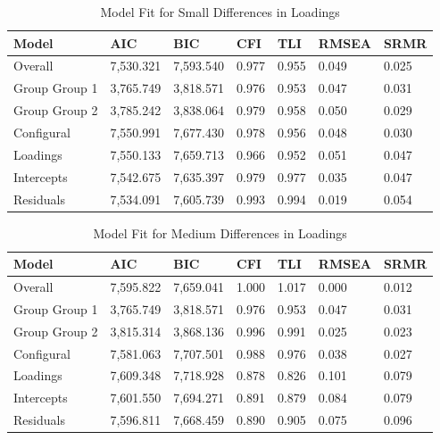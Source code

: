 \documentclass[
  man,floatsintext]{apa7}
\begin{document}
\begin{table}[tbp]

\begin{center}
\begin{threeparttable}

\caption{\label{tab:tab2}Model Fit for Small Differences in Loadings}

\begin{tabular}{lllllll}
\toprule
Model & AIC & BIC & CFI & TLI & RMSEA & SRMR\\
\midrule
Overall & 7,530.321 & 7,593.540 & 0.977 & 0.955 & 0.049 & 0.025\\
Group Group 1 & 3,765.749 & 3,818.571 & 0.976 & 0.953 & 0.047 & 0.031\\
Group Group 2 & 3,785.242 & 3,838.064 & 0.979 & 0.958 & 0.050 & 0.029\\
Configural & 7,550.991 & 7,677.430 & 0.978 & 0.956 & 0.048 & 0.030\\
Loadings & 7,550.133 & 7,659.713 & 0.966 & 0.952 & 0.051 & 0.047\\
Intercepts & 7,542.675 & 7,635.397 & 0.979 & 0.977 & 0.035 & 0.047\\
Residuals & 7,534.091 & 7,605.739 & 0.993 & 0.994 & 0.019 & 0.054\\
\bottomrule
\end{tabular}

\end{threeparttable}
\end{center}

\end{table}

\begin{table}[tbp]

\begin{center}
\begin{threeparttable}

\caption{\label{tab:tab3}Model Fit for Medium Differences in Loadings}

\begin{tabular}{lllllll}
\toprule
Model & AIC & BIC & CFI & TLI & RMSEA & SRMR\\
\midrule
Overall & 7,595.822 & 7,659.041 & 1.000 & 1.017 & 0.000 & 0.012\\
Group Group 1 & 3,765.749 & 3,818.571 & 0.976 & 0.953 & 0.047 & 0.031\\
Group Group 2 & 3,815.314 & 3,868.136 & 0.996 & 0.991 & 0.025 & 0.023\\
Configural & 7,581.063 & 7,707.501 & 0.988 & 0.976 & 0.038 & 0.027\\
Loadings & 7,609.348 & 7,718.928 & 0.878 & 0.826 & 0.101 & 0.079\\
Intercepts & 7,601.550 & 7,694.271 & 0.891 & 0.879 & 0.084 & 0.079\\
Residuals & 7,596.811 & 7,668.459 & 0.890 & 0.905 & 0.075 & 0.096\\
\bottomrule
\end{tabular}

\end{threeparttable}
\end{center}

\end{table}
\end{document}
